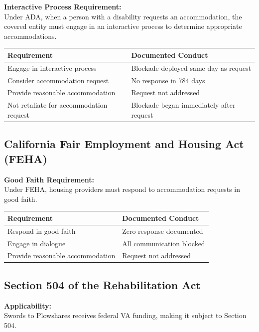 \documentclass[12pt,letterpaper]{article}
\begin{document}
\textbf{Interactive Process Requirement:}\\
Under ADA, when a person with a disability requests an accommodation, the covered entity must engage in an interactive process to determine appropriate accommodations.

\begin{center}
\begin{tabular}{ll}
\toprule
\textbf{Requirement} & \textbf{Documented Conduct} \\
\midrule
Engage in interactive process & Blockade deployed same day as request \\
Consider accommodation request & No response in 784 days \\
Provide reasonable accommodation & Request not addressed \\
Not retaliate for accommodation request & Blockade began immediately after request \\
\bottomrule
\end{tabular}
\end{center}

\subsection{California Fair Employment and Housing Act (FEHA)}

\textbf{Good Faith Requirement:}\\
Under FEHA, housing providers must respond to accommodation requests in good faith.

\begin{center}
\begin{tabular}{ll}
\toprule
\textbf{Requirement} & \textbf{Documented Conduct} \\
\midrule
Respond in good faith & Zero response documented \\
Engage in dialogue & All communication blocked \\
Provide reasonable accommodation & Request not addressed \\
\bottomrule
\end{tabular}
\end{center}

\subsection{Section 504 of the Rehabilitation Act}

\textbf{Applicability:}\\
Swords to Plowshares receives federal VA funding, making it subject to Section 504.
\end{document}
